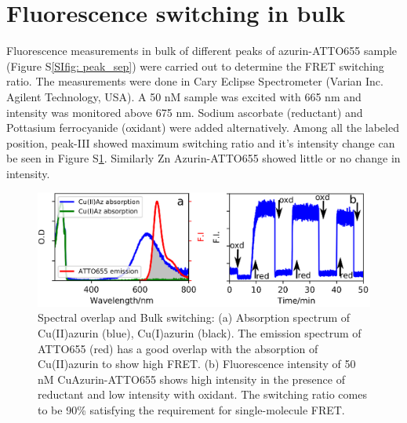\documentclass[11pt,a4paper,onecolumn]{article}
\begin{document}
\section{Fluorescence switching in bulk}
Fluorescence measurements in bulk of different peaks of azurin-ATTO655 sample (Figure S\ref{SIfig: peak_sep}) were carried out to determine the FRET switching ratio. The measurements were done in Cary Eclipse Spectrometer (Varian Inc. Agilent Technology, USA). A 50 nM sample was excited with 665 nm and intensity was monitored above 675 nm. Sodium ascorbate (reductant) and Pottasium ferrocyanide (oxidant) were added alternatively. Among all the labeled position, peak-III showed maximum switching ratio and it's intensity change can be seen in Figure S\ref{SIfig: switching}. Similarly Zn Azurin-ATTO655 showed little or no change in intensity.
\begin{figure}
  \centering
  \includegraphics{spectral_overlap_switching.eps}
  \makeatletter
  \renewcommand{\fnum@figure}{\figurename~S\thefigure}
  \makeatother
  \caption{Spectral overlap and Bulk switching: (a) Absorption spectrum of Cu(II)azurin (blue), Cu(I)azurin (black). The emission spectrum of ATTO655 (red) has a good overlap with the absorption of Cu(II)azurin to show high FRET. (b) Fluorescence intensity of 50 nM CuAzurin-ATTO655 shows high intensity in the presence of reductant and low intensity with oxidant. The switching ratio comes to be 90\% satisfying the requirement for single-molecule FRET.}
  \label{SIfig: switching}
\end{figure}
\end{document}
